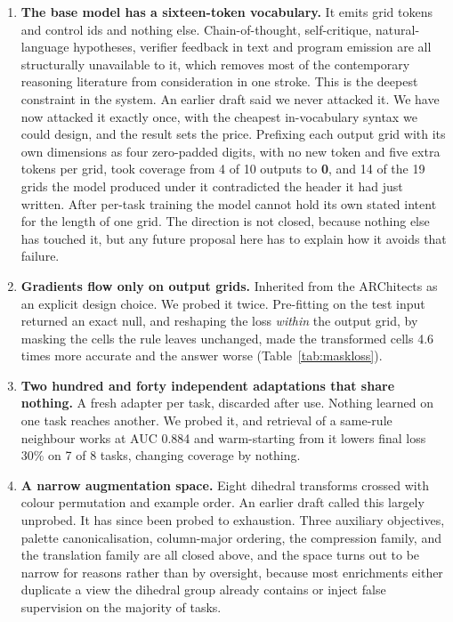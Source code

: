 \documentclass[11pt]{article}
\begin{document}
\begin{enumerate}[leftmargin=1.5em,itemsep=2pt]
\item \textbf{The base model has a sixteen-token vocabulary.} It emits grid tokens and control ids and
nothing else. Chain-of-thought, self-critique, natural-language hypotheses, verifier feedback in text
and program emission are all structurally unavailable to it, which removes most of the contemporary
reasoning literature from consideration in one stroke. This is the deepest constraint in the system.
An earlier draft said we never attacked it. We have now attacked it exactly once, with the cheapest
in-vocabulary syntax we could design, and the result sets the price. Prefixing each output grid with
its own dimensions as four zero-padded digits, with no new token and five extra tokens per grid, took
coverage from 4 of 10 outputs to \textbf{0}, and 14 of the 19 grids the model produced under it
contradicted the header it had just written. After per-task training the model cannot hold its own
stated intent for the length of one grid. The direction is not closed, because nothing else has
touched it, but any future proposal here has to explain how it avoids that failure.
\item \textbf{Gradients flow only on output grids.} Inherited from the ARChitects as an explicit design
choice. We probed it twice. Pre-fitting on the test input returned an exact null, and reshaping the loss
\emph{within} the output grid, by masking the cells the rule leaves unchanged, made the transformed
cells 4.6 times more accurate and the answer worse (Table~\ref{tab:maskloss}).
\item \textbf{Two hundred and forty independent adaptations that share nothing.} A fresh adapter per
task, discarded after use. Nothing learned on one task reaches another. We probed it, and retrieval of a
same-rule neighbour works at AUC 0.884 and warm-starting from it lowers final loss 30\% on 7 of 8
tasks, changing coverage by nothing.
\item \textbf{A narrow augmentation space.} Eight dihedral transforms crossed with colour permutation
and example order. An earlier draft called this largely unprobed. It has since been probed to
exhaustion. Three auxiliary objectives, palette canonicalisation, column-major ordering, the
compression family, and the translation family are all closed above, and the space turns out to be
narrow for reasons rather than by oversight, because most enrichments either duplicate a view the dihedral
group already contains or inject false supervision on the majority of tasks.

\end{enumerate}
\end{document}
